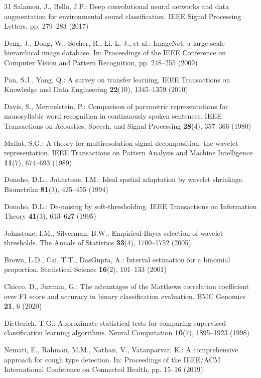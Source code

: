 \begin{thebibliography}{31}
Salamon, J., Bello, J.P.: Deep convolutional neural networks and data
augmentation for environmental sound classification. IEEE Signal Processing
Letters, pp. 279--283 (2017)

Deng, J., Dong, W., Socher, R., Li, L.-J., et al.: ImageNet: a large-scale
hierarchical image database. In: Proceedings of the IEEE Conference on
Computer Vision and Pattern Recognition, pp. 248--255 (2009)

Pan, S.J., Yang, Q.: A survey on transfer learning. IEEE Transactions on
Knowledge and Data Engineering \textbf{22}(10), 1345--1359 (2010)

Davis, S., Mermelstein, P.: Comparison of parametric representations for
monosyllabic word recognition in continuously spoken sentences. IEEE
Transactions on Acoustics, Speech, and Signal Processing \textbf{28}(4),
357--366 (1980)

Mallat, S.G.: A theory for multiresolution signal decomposition: the wavelet
representation. IEEE Transactions on Pattern Analysis and Machine Intelligence
\textbf{11}(7), 674--693 (1989)

Donoho, D.L., Johnstone, I.M.: Ideal spatial adaptation by wavelet shrinkage.
Biometrika \textbf{81}(3), 425--455 (1994)

Donoho, D.L.: De-noising by soft-thresholding. IEEE Transactions on
Information Theory \textbf{41}(3), 613--627 (1995)

Johnstone, I.M., Silverman, B.W.: Empirical Bayes selection of wavelet
thresholds. The Annals of Statistics \textbf{33}(4), 1700--1752 (2005)

Brown, L.D., Cai, T.T., DasGupta, A.: Interval estimation for a binomial
proportion. Statistical Science \textbf{16}(2), 101--133 (2001)

Chicco, D., Jurman, G.: The advantages of the Matthews correlation
coefficient over F1 score and accuracy in binary classification evaluation.
BMC Genomics \textbf{21}, 6 (2020)

Dietterich, T.G.: Approximate statistical tests for comparing supervised
classification learning algorithms. Neural Computation \textbf{10}(7),
1895--1923 (1998)

Nemati, E., Rahman, M.M., Nathan, V., Vatanparvar, K.: A comprehensive
approach for cough type detection. In: Proceedings of the IEEE/ACM
International Conference on Connected Health, pp. 15--16 (2019)


\end{thebibliography}
